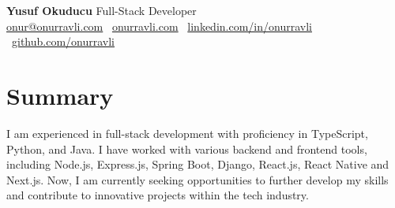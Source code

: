 \documentclass[10pt,a4paper]{extarticle}
\begin{document}
\begin{center}
    \begin{minipage}{\textwidth}
        \centering
        {\LARGE\textbf{Yusuf Okuducu}} \hspace{2pt} {\LARGE{Full-Stack Developer}}\\[10pt]
        \href{mailto:onur@onurravli.com}{onur@onurravli.com} \textbullet\
        \href{https://onurravli.com}{onurravli.com} \textbullet\
        \href{https://linkedin.com/in/onurravli}{linkedin.com/in/onurravli} \textbullet\
        \href{https://github.com/onurravli}{github.com/onurravli}
    \end{minipage}
\end{center}
\section{Summary}
I am experienced in full-stack development with proficiency in TypeScript, Python, and Java. I have worked
with various backend and frontend tools, including Node.js, Express.js, Spring Boot, Django, React.js, React
Native and Next.js. Now, I am currently seeking opportunities to further develop my skills and contribute to
innovative projects within the tech industry.
\end{document}
